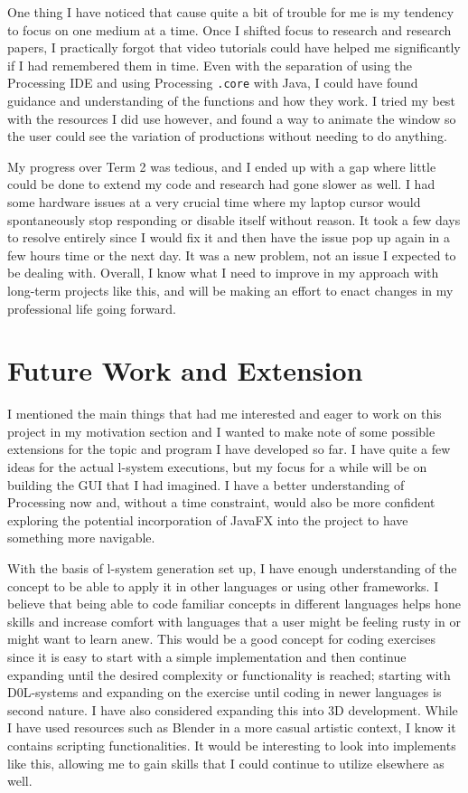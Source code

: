 \documentclass[]{final_report}
\begin{document}
One thing I have noticed that cause quite a bit of trouble for me is my tendency to focus on one medium at a time. Once I shifted focus to research and research papers, I practically forgot that video tutorials could have helped me significantly if I had remembered them in time. Even with the separation of using the Processing IDE and using Processing \verb|.core| with Java, I could have found guidance and understanding of the functions and how they work. I tried my best with the resources I did use however, and found a way to animate the window so the user could see the variation of productions without needing to do anything.

My progress over Term 2 was tedious, and I ended up with a gap where little could be done to extend my code and research had gone slower as well. I had some hardware issues at a very crucial time where my laptop cursor would spontaneously stop responding or disable itself without reason. It took a few days to resolve entirely since I would fix it and then have the issue pop up again in a few hours time or the next day. It was a new problem, not an issue I expected to be dealing with. Overall, I know what I need to improve in my approach with long-term projects like this, and will be making an effort to enact changes in my professional life going forward.

\section{Future Work and Extension}

I mentioned the main things that had me interested and eager to work on this project in my motivation section and I wanted to make note of some possible extensions for the topic and program I have developed so far. I have quite a few ideas for the actual l-system executions, but my focus for a while will be on building the GUI that I had imagined. I have a better understanding of Processing now and, without a time constraint, would also be more confident exploring the potential incorporation of JavaFX into the project to have something more navigable. 

With the basis of l-system generation set up, I have enough understanding of the concept to be able to apply it in other languages or using other frameworks. I believe that being able to code familiar concepts in different languages helps hone skills and increase comfort with languages that a user might be feeling rusty in or might want to learn anew. This would be a good concept for coding exercises since it is easy to start with a simple implementation and then continue expanding until the desired complexity or functionality is reached; starting with D0L-systems and expanding on the exercise until coding in newer languages is second nature. I have also considered expanding this into 3D development. While I have used resources such as Blender in a more casual artistic context, I know it contains scripting functionalities. It would be interesting to look into implements like this, allowing me to gain skills that I could continue to utilize elsewhere as well. 
\end{document}
